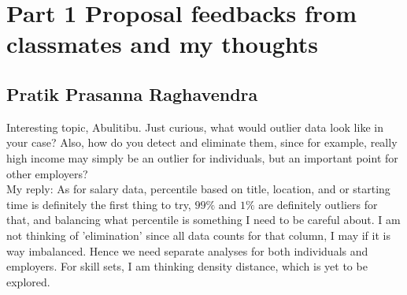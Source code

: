 \section{Part 1 Proposal feedbacks from classmates and my thoughts}
\subsection*{Pratik Prasanna Raghavendra}
Interesting topic, Abulitibu. Just curious, what would outlier data look like in your case? Also, how do you detect and eliminate them, since for example, really high income may simply be an outlier for individuals, but an important point for other employers?\\
My reply: As for salary data, percentile based on title, location, and or starting time is definitely the first thing to try, $99\%$ and $1\%$ are definitely outliers for that, and balancing what percentile is something I need to be careful about. I am not thinking of 'elimination' since all data counts for that column, I may if it is way imbalanced. Hence we need separate analyses for both individuals and employers.
For skill sets, I am thinking density distance, which is yet to be explored. 

